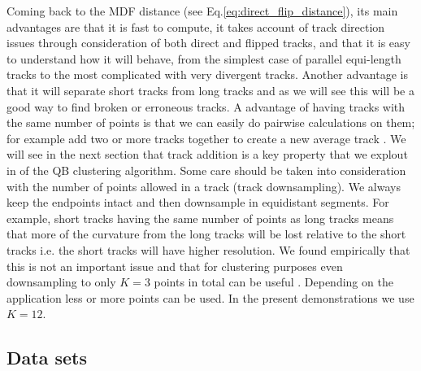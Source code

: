 \documentclass[preprint,authoryear,a4paper,10pt,onecolumn]{elsarticle}
\begin{document}



Coming back to the MDF distance (see Eq.\ref{eq:direct_flip_distance}),
its main advantages are that it is fast to compute, it takes account of
track direction issues through consideration of both direct and flipped
tracks, and that it is easy to understand how it will behave, from the
simplest case of parallel equi-length tracks to the most complicated
with very divergent tracks. Another advantage is that it will separate
short tracks from long tracks and as we will see this will be a good way
to find broken or erroneous tracks. A advantage of having tracks with
the same number of points is that we can easily do pairwise calculations
on them; for example add two or more tracks together to create a new
average track . We will see in the next section that track addition is a
key property that we explout in of the QB clustering algorithm.  Some
care should be taken into consideration with the number of points
allowed in a track (track downsampling). We always keep the endpoints
intact and then downsample in equidistant segments. For example, short
tracks having the same number of points as long tracks means that more
of the curvature from the long tracks will be lost relative to the short
tracks i.e. the short tracks will have higher resolution.  We found
empirically that this is not an important issue and that for clustering
purposes even downsampling to only $K=3$ points in total can be useful
\cite{EGMB10}. Depending on the application less or more points can be
used. In the present demonstrations we use $K=12$.

\subsection{\label{sub:QB-Data-sets}Data sets}
\end{document}
